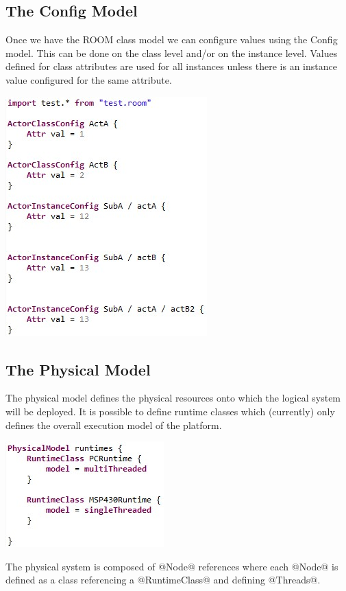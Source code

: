 \subsection{The Config Model}

Once we have the ROOM class model we can configure values using the Config model. This can be done on the 
class level and/or on the instance level. Values defined for class attributes are used for all instances 
unless there is an instance value configured for the same attribute.

\includegraphics{images/080-config.jpg}

\subsection{The Physical Model}

The physical model defines the physical resources onto which the logical system will be deployed. It is 
possible to define runtime classes which (currently) only defines the overall execution model of the 
platform.

\includegraphics{images/080-runtimes.jpg}

The physical system is composed of @Node@ references where each @Node@ is defined as a class referencing a 
@RuntimeClass@ and defining @Threads@.

